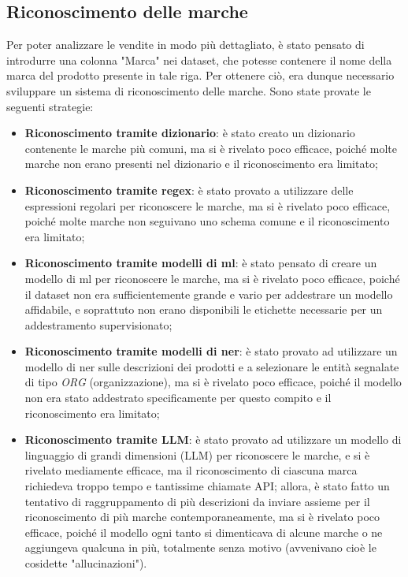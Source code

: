 \subsection{Riconoscimento delle marche}
\label{sec:recognition-brands}

Per poter analizzare le vendite in modo più dettagliato, è stato pensato di introdurre una colonna "Marca" nei dataset, che potesse contenere il nome della marca del prodotto presente in tale riga. Per ottenere ciò, era dunque necessario sviluppare un sistema di riconoscimento delle marche. Sono state provate le seguenti strategie:
\begin{itemize}
    \item \textbf{Riconoscimento tramite dizionario}: è stato creato un dizionario contenente le marche più comuni, ma si è rivelato poco efficace, poiché molte marche non erano presenti nel dizionario e il riconoscimento era limitato;
    \item \textbf{Riconoscimento tramite regex}: è stato provato a utilizzare delle espressioni regolari per riconoscere le marche, ma si è rivelato poco efficace, poiché molte marche non seguivano uno schema comune e il riconoscimento era limitato;
    \item \textbf{Riconoscimento tramite modelli di \gls{ml}{}}: è stato pensato di creare un modello di \gls{ml} per riconoscere le marche, ma si è rivelato poco efficace, poiché il dataset non era sufficientemente grande e vario per addestrare un modello affidabile, e soprattuto non erano disponibili le etichette necessarie per un addestramento supervisionato;
    \item \textbf{Riconoscimento tramite modelli di \gls{ner}{}}: è stato provato ad utilizzare un modello di \gls{ner} sulle descrizioni dei prodotti e a selezionare le entità segnalate di tipo \emph{ORG} (organizzazione), ma si è rivelato poco efficace, poiché il modello non era stato addestrato specificamente per questo compito e il riconoscimento era limitato;
    \item \textbf{Riconoscimento tramite LLM}: è stato provato ad utilizzare un modello di linguaggio di grandi dimensioni (LLM) per riconoscere le marche, e si è rivelato mediamente efficace, ma il riconoscimento di ciascuna marca richiedeva troppo tempo e tantissime chiamate API; allora, è stato fatto un tentativo di raggruppamento di più descrizioni da inviare assieme per il riconoscimento di più marche contemporaneamente, ma si è rivelato poco efficace, poiché il modello ogni tanto si dimenticava di alcune marche o ne aggiungeva qualcuna in più, totalmente senza motivo (avvenivano cioè le cosidette "allucinazioni").
\end{itemize}


